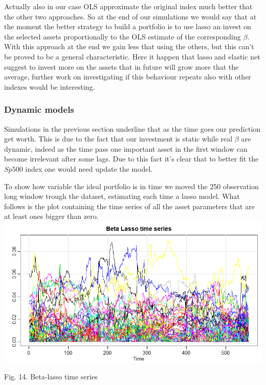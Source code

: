 \documentclass{article}%
\begin{document}
Actually also in our case OLS approximate the original index much better that the other two approaches. So at the end of our simulations we would say that at the moment the better strategy to build a portfolio is to use lasso an invest on the selected assets proportionally to the OLS estimate of the corresponding $\beta$. 
With this approach at the end we gain less that using the others, but this can't be proved to be a general characteristic. Here it happen that lasso and elastic net suggest to invest more on the assets that in future will grow more that the average, further work on investigating if this behaviour repeats also with other indexes would be interesting.

\subsubsection{Dynamic models}

Simulations in the previous section underline that as the time goes our prediction get worth. This is due to the fact that our investment is static while real $\beta$ are dynamic, indeed as the time pass one important asset in the first window can become irrelevant after some lags. Due to this fact it's clear that to better fit the $Sp500$ index one would need update the model.

To show how variable the ideal portfolio is in time we moved the 250 observation long window trough the dataset, estimating each time a lasso model. What follows is the plot containing the time series of all the asset parameters that are at least ones bigger than zero.
\\

\includegraphics[scale=0.55]{betatime}
\begin{center}
\begin{small}
Fig. 14. Beta-lasso time series
\\

\end{small}
\end{center}
\end{document}

